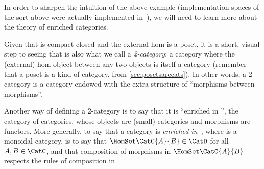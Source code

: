 In order to sharpen the intuition of the above example (implementation spaces of the sort above were actually implemented in~\cite{censi}), we will need to learn more about the theory of enriched categories.

Given that \DP is compact closed and the external hom is a poset, it is a short, visual step to seeing that \DP is also what we call a \emph{2-category}: a category where the (external) hom-object between any two objects is itself a category (remember that a poset is a kind of category, from \cref{sec:posetsarecats}).
In other words, a 2-category is a category endowed with the extra structure of ``morphisms between morphisms''.

Another way of defining a 2-category is to say that it is ``enriched in \Category'', the category of categories, whose objects are (small) categories and morphisms are functors.
More generally, to say that a category \CatC is \emph{enriched in~\CatD}, where \CatD is a monoidal category, is to say that $\HomSet\CatC{A}{B} \in \CatD$ for all $A,B \in \CatC$, and that composition of morphisms in $\HomSet\CatC{A}{B}$ respects the rules of composition in \CatD.


